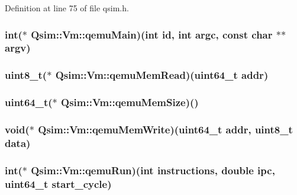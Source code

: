 Definition at line 75 of file qsim.h.
\subsubsection[{qemuMain}]{\setlength{\rightskip}{0pt plus 5cm}int($\ast$ {\bf Qsim::Vm::qemuMain})(int id, int argc, const char $\ast$$\ast$argv)\hspace{0.3cm}{\tt  [private]}}\label{classQsim_1_1Vm_6fbcbcfacd39c1ec8fb7e8e3f6b5c33e}


\subsubsection[{qemuMemRead}]{\setlength{\rightskip}{0pt plus 5cm}uint8\_\-t($\ast$ {\bf Qsim::Vm::qemuMemRead})(uint64\_\-t addr)\hspace{0.3cm}{\tt  [private]}}\label{classQsim_1_1Vm_047a996c7ccd3acd5b0983fea831009c}


\subsubsection[{qemuMemSize}]{\setlength{\rightskip}{0pt plus 5cm}uint64\_\-t($\ast$ {\bf Qsim::Vm::qemuMemSize})()\hspace{0.3cm}{\tt  [private]}}\label{classQsim_1_1Vm_3ac5cf2e48416726adb845cb25043150}


\subsubsection[{qemuMemWrite}]{\setlength{\rightskip}{0pt plus 5cm}void($\ast$ {\bf Qsim::Vm::qemuMemWrite})(uint64\_\-t addr, uint8\_\-t {\bf data})\hspace{0.3cm}{\tt  [private]}}\label{classQsim_1_1Vm_52fae64fec14e9acf87f869d3951379a}


\subsubsection[{qemuRun}]{\setlength{\rightskip}{0pt plus 5cm}int($\ast$ {\bf Qsim::Vm::qemuRun})(int instructions, double {\bf ipc}, uint64\_\-t start\_\-cycle)\hspace{0.3cm}{\tt  [private]}}\label{classQsim_1_1Vm_b0f6a196d725ff686eedb3975afe12ae}


